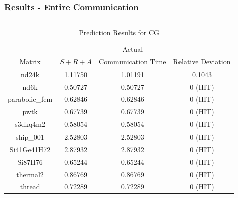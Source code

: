 \documentclass{beamer}
\begin{document}
\begin{frame}
\frametitle{Results - Entire Communication}
\begin{columns}[c]

\begin{table}[h!]
\centering
\caption{Prediction Results for CG}
\begin{tabular}{|c|c|c|c|}
\hline
 & & Actual& \\
Matrix & $S+R+A$ &Communication Time & Relative Deviation \\
\hline
nd24k & 1.11750 & 1.01191 & 0.1043 \\
nd6k & 0.50727 & 0.50727 & 0 (HIT) \\
parabolic\_fem & 0.62846 & 0.62846 & 0 (HIT) \\
pwtk & 0.67739 & 0.67739 & 0 (HIT) \\
s3dkq4m2 & 0.58054 & 0.58054 & 0 (HIT) \\
ship\_001 & 2.52803 & 2.52803 & 0 (HIT) \\
Si41Ge41H72 & 2.87932 & 2.87932 & 0 (HIT) \\
Si87H76 & 0.65244 & 0.65244 & 0 (HIT) \\
thermal2 & 0.86769 & 0.86769 & 0 (HIT) \\
thread & 0.72289 & 0.72289 & 0 (HIT) \\
\hline
\end{tabular}
\end{table}
\end{columns}
\end{frame}
\end{document}
